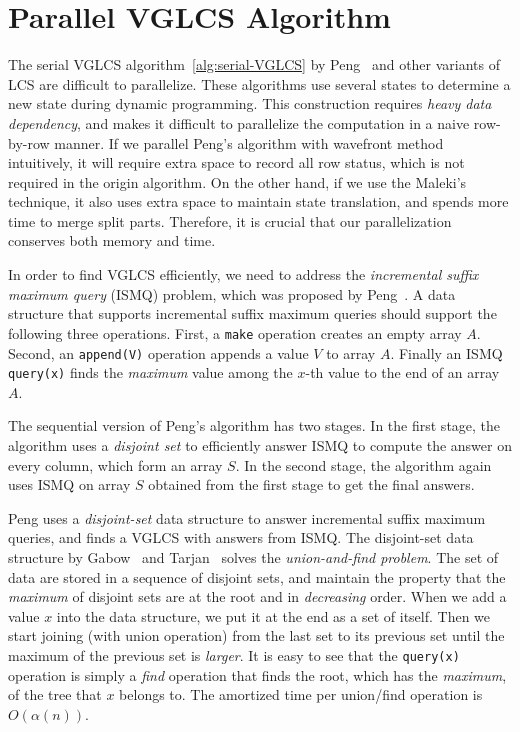 \section{Parallel VGLCS Algorithm} %
\label{sec:parallelVGLCS}



The serial VGLCS algorithm~\ref{alg:serial-VGLCS} by
Peng~\cite{Peng2011TheLC} and other variants of LCS are difficult to
parallelize.  These algorithms use several states to determine a new
state during dynamic programming.  This construction requires {\em
  heavy data dependency}, and makes it difficult to parallelize the
computation in a naive row-by-row manner.  If we parallel Peng's
algorithm with wavefront method intuitively, it will require extra
space to record all row status, which is not required in the origin
algorithm.  On the other hand, if we use the
Maleki's~\cite{Maleki2016EfficientPU} technique, it also uses extra
space to maintain state translation, and spends more time to merge
split parts.  Therefore, it is crucial that our parallelization
conserves both memory and time.

In order to find VGLCS efficiently, we need to address the {\em
  incremental suffix maximum query} (ISMQ) problem, which was
proposed by Peng~\cite{Peng2011TheLC}.  A data structure that supports
incremental suffix maximum queries should support the following three
operations.  First, a {\tt make} operation creates an empty array $A$.
Second, an {\tt append(V)} operation appends a value $V$ to array $A$.
Finally an ISMQ {\tt query(x)} finds the {\em maximum} value among the
$x$-th value to the end of an array $A$.

The sequential version of Peng's algorithm has two stages.  In the
first stage, the algorithm uses a {\em disjoint set} to efficiently
answer ISMQ to compute the answer on every column, which form an array
$S$.  In the second stage, the algorithm again uses ISMQ on array $S$
obtained from the first stage to get the final answers.

Peng uses a {\em disjoint-set} data structure to answer incremental
suffix maximum queries, and finds a VGLCS with answers from ISMQ. The
disjoint-set data structure by Gabow~\cite{Gabow1983ALA} and
Tarjan~\cite{Tarjan1975EfficiencyOA} solves the {\em union-and-find
  problem}.  The set of data are stored in a sequence of disjoint
sets, and maintain the property that the {\em maximum} of disjoint
sets are at the root and in {\em decreasing} order.  When we add a
value $x$ into the data structure, we put it at the end as a set of
itself.  Then we start joining (with union operation) from the last
set to its previous set until the maximum of the previous set is {\em
  larger}.  It is easy to see that the {\tt query(x)} operation is
simply a {\em find} operation that finds the root, which has the {\em
  maximum}, of the tree that $x$ belongs to.  The amortized time per
union/find operation is $O(\alpha(n))$.

